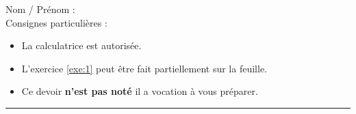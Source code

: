 
\usetikzlibrary {datavisualization}

\newcommand{\tableaucroise}[4]{
\begin{tabular}{|c|c|c|c|}
	\cline{2-4}
	\multicolumn{1}{c|}{} & #1 \\ \hline
	#2 \\ \hline
	#3  \\ \hline
	#4  \\ \hline
\end{tabular}
}



\reversemarginpar

\pagestyle{fancy}
\fancyhead[R]{\today}

\null\vspace{-30pt}
Nom / Prénom : \\

Consignes particulières : 
\begin{itemize}[label=$\bullet$]
	\item 
	La calculatrice est {autorisée}.
	\item 
	L'exercice \ref{exe:1} peut être fait partiellement sur la feuille.
	\item 
	Ce devoir \textbf{n'est pas noté} il a vocation à vous préparer.
\end{itemize}

\hrule

